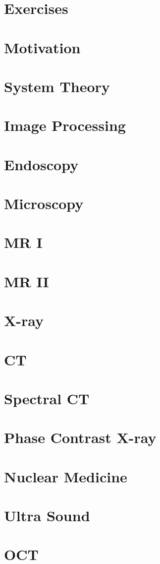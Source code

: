 \documentclass{beamer}
\begin{document}
\section{Exercises} 
\section{Motivation}
\section{System Theory}
\section{Image Processing}
\section{Endoscopy}
\section{Microscopy}
\section{MR I}
\section{MR II}
\section{X-ray}
\section{CT}
\section{Spectral CT}
\section{Phase Contrast X-ray}
\section{Nuclear Medicine}
\section{Ultra Sound}
\section{OCT}
\end{document}
